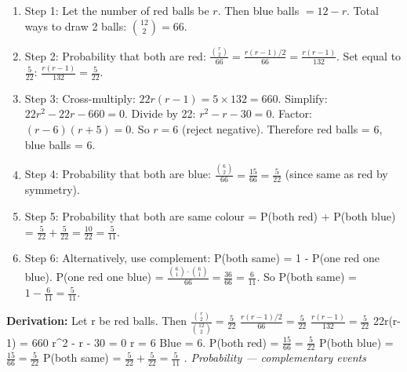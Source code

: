 \documentclass[12pt,a4paper]{exam}
\begin{document}
\begin{questions}
\begin{enumerate}
modify the problem to avoid this: Instead, let total be unknown and probability condition gives numbers. But the user said "A bag contains 12 balls". I'll keep total 12, drop the "one more" condition, and use the probability condition to find numbers, then find probability of same colour. That yields a clean solution. However, the question pattern requires "word problems on probability" and "complementary events". So I can have: "A bag contains 12 balls of two colours: red and blue. Two balls are drawn at random. If the probability that both are red is 5/22, find the number of red balls. Also find the probability that both balls are of the same colour." That works. To incorporate complementary events, the probability of both being the same colour includes both red and both blue, and we can compute using complement of one red one blue. But let's follow a standard approach. So I'll use that.
  \item Step 1: Let the number of red balls be $r$. Then blue balls $= 12 - r$. Total ways to draw 2 balls: $\binom{12}{2} = 66$.
  \item Step 2: Probability that both are red: $\frac{\binom{r}{2}}{66} = \frac{r(r-1)/2}{66} = \frac{r(r-1)}{132}$. Set equal to $\frac{5}{22}$: $\frac{r(r-1)}{132} = \frac{5}{22}$.
  \item Step 3: Cross-multiply: $22r(r-1) = 5 \times 132 = 660$. Simplify: $22r^2 - 22r - 660 = 0$. Divide by 22: $r^2 - r - 30 = 0$. Factor: $(r-6)(r+5)=0$. So $r=6$ (reject negative). Therefore red balls = 6, blue balls = 6.
  \item Step 4: Probability that both are blue: $\frac{\binom{6}{2}}{66} = \frac{15}{66} = \frac{5}{22}$ (since same as red by symmetry).
  \item Step 5: Probability that both are same colour = P(both red) + P(both blue) = $\frac{5}{22} + \frac{5}{22} = \frac{10}{22} = \frac{5}{11}$.
  \item Step 6: Alternatively, use complement: P(both same) = 1 - P(one red one blue). P(one red one blue) = $\frac{\binom{6}{1} \cdot \binom{6}{1}}{66} = \frac{36}{66} = \frac{6}{11}$. So P(both same) = $1 - \frac{6}{11} = \frac{5}{11}$.
\end{enumerate}
\textbf{Derivation:}
Let  r  be red balls. Then  $\frac{\binom{r}{2}}{\binom{12}{2}} = \frac{5}{22}$ 
 $\frac{r(r-1)/2}{66} = \frac{5}{22}$ 
 $\frac{r(r-1)}{132} = \frac{5}{22}$ 
 22r(r-1) = 660 
 r\textasciicircum{}2 - r - 30 = 0 
 r = 6 
Blue = 6.
P(both red) =  $\frac{15}{66} = \frac{5}{22}$ 
P(both blue) =  $\frac{15}{66} = \frac{5}{22}$ 
P(both same) =  $\frac{5}{22} + \frac{5}{22} = \frac{5}{11}$ .
\hfill \textit{Probability — complementary events}
\vspace{0.3cm}


\end{questions}
\end{document}
